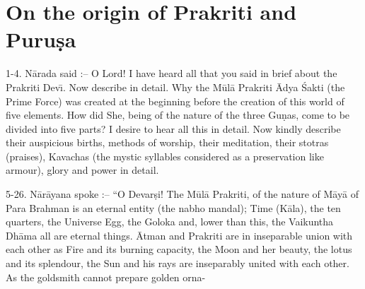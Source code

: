\chapter{On the origin of Prakriti and Puru\d{s}a}

1-4. N\=arada said :-- O Lord! I have heard all that you said in brief about the Prakriti Dev\={\i}. Now describe in detail. Why the M\=ul\=a Prakriti \=Adya \'Sakti (the Prime Force) was created at the beginning before the creation of this world of five elements. How did She, being of the nature of the three Gu\d{n}as, come to be divided into five parts? I desire to hear all this in detail. Now kindly describe their auspicious births, methods of worship, their meditation, their stotras (praises), Kavachas (the mystic syllables considered as a preservation like armour), glory and power in detail.

5-26. N\=ar\=ayana spoke :-- ``O Devar\d{s}i! The M\=ul\=a Prakriti, of the nature of M\=ay\=a of Para Brahman is an eternal entity (the nabho mandal); Time (K\=ala), the ten quarters, the Universe Egg, the Goloka and, lower than this, the Vaikuntha Dh\=ama all are eternal things. \=Atman and Prakriti are in inseparable union with each other as Fire and its burning capacity, the Moon and her beauty, the lotus and its splendour, the Sun and his rays are inseparably united with each other. As the goldsmith cannot prepare golden orna-

